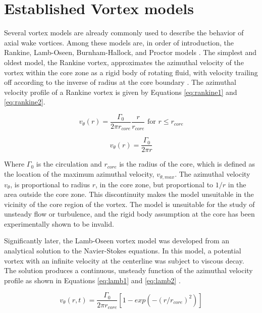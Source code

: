 \section{Established Vortex models}
Several vortex models are already commonly used to describe the behavior of 
axial wake vortices. Among these models are, in order of introduction, the 
Rankine, Lamb-Oseen, Burnham-Hallock, and Proctor models \cite{ahmad2014}. The 
simplest and oldest model, the Rankine vortex, approximates the azimuthal 
velocity of the vortex within the core zone as a rigid body of rotating fluid, 
with velocity trailing off according to the inverse of radius at the core 
boundary \cite{rankine1869}. The azimuthal velocity profile of a Rankine vortex 
is given by Equations \ref{eq:rankine1} and \ref{eq:rankine2}.

\begin{equation}
v_{\theta}(r) = \frac{\Gamma_0}{2 \pi r_{core}} \frac{r}{r_{core}} 
	\text{ for } r \leq r_{core}
	\label{eq:rankine1}
\end{equation}

\begin{equation}
v_{\theta}(r) = \frac{\Gamma_0}{2 \pi r}
	\label{eq:rankine2}
\end{equation}

\noindent
Where $\Gamma_0$ is the circulation and $r_{core}$ is the radius of the core, 
which is defined as the location of the maximum azimuthal velocity, 
$v_{\theta, max}$. The azimuthal velocity $v_{\theta}$, is proportional to 
radius $r$, in the core zone, but proportional to $1/r$ in the area outside the 
core zone. This discontinuity makes the model unsuitable in the vicinity of the 
core region of the vortex. The model is unsuitable for the study of unsteady 
flow or turbulence, and the rigid body assumption at the core has been 
experimentally shown to be invalid.

Significantly later, the Lamb-Oseen vortex model was developed from an 
analytical solution to the Navier-Stokes equations. In this model, a potential 
vortex with an infinite velocity at the centerline was subject to viscous 
decay. The solution produces a continuous, unsteady function of the azimuthal 
velocity profile as shown in Equations \ref{eq:lamb1} and \ref{eq:lamb2} 
\cite{lamb1932}.

\begin{equation}
v_{\theta}(r,t) = \frac{\Gamma_0}{2 \pi r_{core}}[1 - 
							exp(-(r / r_{core})^2)]
	\label{eq:lamb1}
\end{equation}

